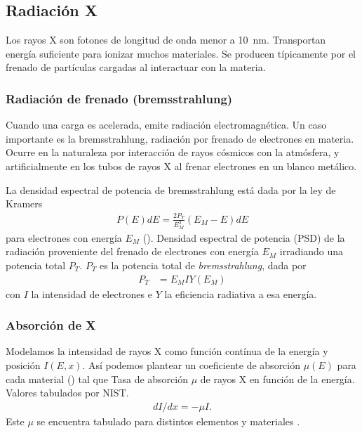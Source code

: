 \subsection{Radiación X}
Los rayos X son fotones de longitud de onda menor a \SI{10}{\nano\meter}.
Transportan energía suficiente para ionizar muchos materiales.
Se producen típicamente por el frenado de partículas cargadas al interactuar
con la materia.
\subsubsection{Radiación de frenado (bremsstrahlung)}
Cuando una carga es acelerada, emite radiación
electromagnética\cite{jackson_classical_1998}.
Un caso importante es la bremsstrahlung,
radiación por frenado de electrones en materia.
Ocurre en la naturaleza por interacción de rayos cósmicos con la atmósfera,
y artificialmente en los tubos de rayos X 
al frenar electrones en un blanco metálico.

La densidad espectral de potencia de bremsstrahlung está dada por la ley de
Kramers\cite{kramers_xciii._1923}
\begin{align}
    P(E)dE = \frac{2P_T}{E_M^2}(E_M-E)dE
    \label{eq:kramers}
\end{align} para electrones con energía $E_M$ ().
{Densidad espectral de potencia (PSD) de la radiación proveniente del 
frenado de electrones con energía $E_M$ irradiando una potencia total $P_T$.}
$P_T$ es la potencia total de \emph{bremsstrahlung}, dada por
\begin{align*}
    P_T&=E_MIY(E_M)
\end{align*}con $I$ la intensidad de electrones e $Y$ la eficiencia radiativa a
esa energía.
\subsubsection{Absorción de X}
Modelamos la intensidad de rayos X como función contínua de la energía y
posición $I(E,x)$.
Así podemos plantear un coeficiente de absorción $\mu(E)$ para cada 
material () tal que 
{Tasa de absorción $\mu$ de rayos X en función de la energía.
    Valores tabulados por NIST\cite{xraycoef}.}
\begin{align}
    \label{eq:absorcionx}
    dI/dx=-\mu I.
\end{align}
Este $\mu$ se encuentra tabulado para distintos elementos y materiales
\cite{xraycoef}.

